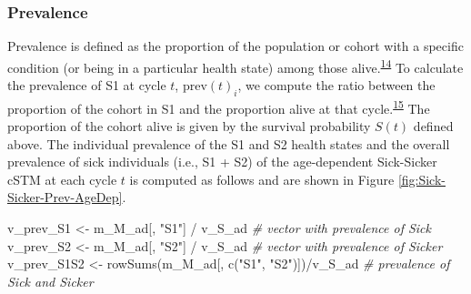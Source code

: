 \documentclass[
]{article}
\newenvironment{Shaded}{\begin{snugshade}}{\end{snugshade}}
\newcommand{\CommentTok}[1]{\textcolor[rgb]{0.56,0.35,0.01}{\textit{#1}}}
\newcommand{\FunctionTok}[1]{\textcolor[rgb]{0.00,0.00,0.00}{#1}}
\newcommand{\NormalTok}[1]{#1}
\newcommand{\OtherTok}[1]{\textcolor[rgb]{0.56,0.35,0.01}{#1}}
\newcommand{\SpecialCharTok}[1]{\textcolor[rgb]{0.00,0.00,0.00}{#1}}
\newcommand{\StringTok}[1]{\textcolor[rgb]{0.31,0.60,0.02}{#1}}
\begin{document}
\hypertarget{prevalence}{%
\subsubsection{Prevalence}\label{prevalence}}

Prevalence is defined as the proportion of the population or cohort with a specific condition (or being in a particular health state) among those alive.\textsuperscript{\protect\hyperlink{ref-Rothman2008h}{14}} To calculate the prevalence of S1 at cycle \(t\), \(\text{prev}(t)_i\), we compute the ratio between the proportion of the cohort in S1 and the proportion alive at that cycle.\textsuperscript{\protect\hyperlink{ref-Keiding1991}{15}} The proportion of the cohort alive is given by the survival probability \(S(t)\) defined above. The individual prevalence of the S1 and S2 health states and the overall prevalence of sick individuals (i.e., S1 + S2) of the age-dependent Sick-Sicker cSTM at each cycle \(t\) is computed as follows and are shown in Figure \ref{fig:Sick-Sicker-Prev-AgeDep}.

\begin{Shaded}
\begin{Highlighting}[]
\NormalTok{v\_prev\_S1   }\OtherTok{\textless{}{-}}\NormalTok{ m\_M\_ad[, }\StringTok{"S1"}\NormalTok{] }\SpecialCharTok{/}\NormalTok{ v\_S\_ad          }\CommentTok{\# vector with prevalence of Sick}
\NormalTok{v\_prev\_S2   }\OtherTok{\textless{}{-}}\NormalTok{ m\_M\_ad[, }\StringTok{"S2"}\NormalTok{] }\SpecialCharTok{/}\NormalTok{ v\_S\_ad          }\CommentTok{\# vector with prevalence of Sicker}
\NormalTok{v\_prev\_S1S2 }\OtherTok{\textless{}{-}} \FunctionTok{rowSums}\NormalTok{(m\_M\_ad[, }\FunctionTok{c}\NormalTok{(}\StringTok{"S1"}\NormalTok{, }\StringTok{"S2"}\NormalTok{)])}\SpecialCharTok{/}\NormalTok{v\_S\_ad }\CommentTok{\# prevalence of Sick and Sicker}
\end{Highlighting}
\end{Shaded}
\end{document}
